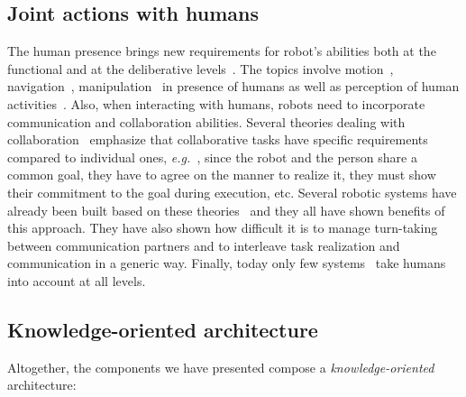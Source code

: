 \documentclass[preprint,3p,times]{elsarticle}
\newcommand{\eg}{{\textit{e.g.\ }}}
\begin{document}
\subsection{Joint actions with humans}
\label{sec:soa}

The human presence brings new requirements for robot's abilities both
at the functional and at the deliberative levels~\cite{Klein2004}. The
topics involve motion~\cite{Kulic2007,Berg2004,Madhava2006},
navigation~\cite{Althaus2004,Sisbot2007}, manipulation~\cite{Kemp2007}
in presence of humans as well as perception of human
activities~\cite{Breazeal2001,Burger2008}. Also, when
interacting with humans, robots need to incorporate communication and
collaboration abilities. Several theories dealing with
collaboration~\cite{Cohen1991,Grosz1996,Clark1996} emphasize that
collaborative tasks have specific requirements compared to individual
ones, \eg, since the robot and the person share a common goal, they
have to agree on the manner to realize it, they must show their
commitment to the goal during execution, etc. Several robotic systems
have already been built based on these
theories~\cite{Rich1997,Sidner2005,Breazeal2003} and they
all have shown benefits of this approach. They have also shown how
difficult it is to manage turn-taking between communication partners
and to interleave task realization and communication in a generic
way. Finally, today only few
systems~\cite{Fong2006,Breazeal2003,Sisbot2008} take humans into
account at all levels.


\subsection{Knowledge-oriented architecture}

Altogether, the components we have presented compose a
\emph{knowledge-oriented} architecture:
\end{document}
